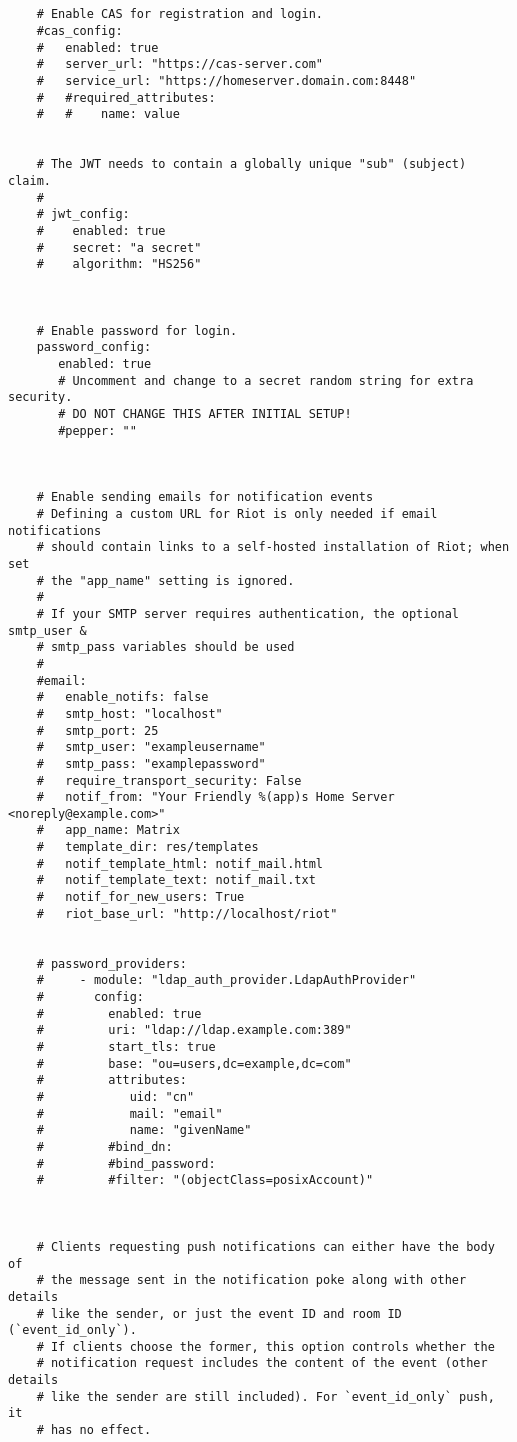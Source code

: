 \begin{lstlisting}
    
    
    # Enable CAS for registration and login.
    #cas_config:
    #   enabled: true
    #   server_url: "https://cas-server.com"
    #   service_url: "https://homeserver.domain.com:8448"
    #   #required_attributes:
    #   #    name: value
    
    
    # The JWT needs to contain a globally unique "sub" (subject) claim.
    #
    # jwt_config:
    #    enabled: true
    #    secret: "a secret"
    #    algorithm: "HS256"
    
    
    
    # Enable password for login.
    password_config:
       enabled: true
       # Uncomment and change to a secret random string for extra security.
       # DO NOT CHANGE THIS AFTER INITIAL SETUP!
       #pepper: ""
    
    
    
    # Enable sending emails for notification events
    # Defining a custom URL for Riot is only needed if email notifications
    # should contain links to a self-hosted installation of Riot; when set
    # the "app_name" setting is ignored.
    #
    # If your SMTP server requires authentication, the optional smtp_user &
    # smtp_pass variables should be used
    #
    #email:
    #   enable_notifs: false
    #   smtp_host: "localhost"
    #   smtp_port: 25
    #   smtp_user: "exampleusername"
    #   smtp_pass: "examplepassword"
    #   require_transport_security: False
    #   notif_from: "Your Friendly %(app)s Home Server <noreply@example.com>"
    #   app_name: Matrix
    #   template_dir: res/templates
    #   notif_template_html: notif_mail.html
    #   notif_template_text: notif_mail.txt
    #   notif_for_new_users: True
    #   riot_base_url: "http://localhost/riot"
    
    
    # password_providers:
    #     - module: "ldap_auth_provider.LdapAuthProvider"
    #       config:
    #         enabled: true
    #         uri: "ldap://ldap.example.com:389"
    #         start_tls: true
    #         base: "ou=users,dc=example,dc=com"
    #         attributes:
    #            uid: "cn"
    #            mail: "email"
    #            name: "givenName"
    #         #bind_dn:
    #         #bind_password:
    #         #filter: "(objectClass=posixAccount)"
    
    
    
    # Clients requesting push notifications can either have the body of
    # the message sent in the notification poke along with other details
    # like the sender, or just the event ID and room ID (`event_id_only`).
    # If clients choose the former, this option controls whether the
    # notification request includes the content of the event (other details
    # like the sender are still included). For `event_id_only` push, it
    # has no effect.
    

\end{lstlisting}
